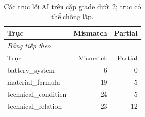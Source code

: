 \begingroup\small\setlength{\tabcolsep}{4pt}\renewcommand{\arraystretch}{1.16}
\begin{longtable}{p{.57\linewidth}rr}
\caption{Các trục lỗi AI trên cặp grade dưới 2; trục có thể chồng lấp.}\label{tab:error-axes}\\
\toprule Trục & Mismatch & Partial \\
\midrule\endfirsthead
\multicolumn{3}{l}{\textit{Bảng tiếp theo}}\\
\toprule Trục & Mismatch & Partial \\
\midrule\endhead
\bottomrule\endfoot
battery\_system & 6 & 0 \\
material\_formula & 19 & 5 \\
technical\_condition & 24 & 5 \\
technical\_relation & 23 & 12 \\
\end{longtable}\endgroup
{}

